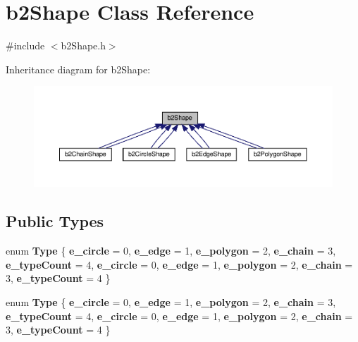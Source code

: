 \hypertarget{classb2Shape}{}\section{b2\+Shape Class Reference}
\label{classb2Shape}


{\ttfamily \#include $<$b2\+Shape.\+h$>$}



Inheritance diagram for b2\+Shape\+:
\nopagebreak
\begin{figure}[H]
\begin{center}
\leavevmode
\includegraphics[width=350pt]{classb2Shape__inherit__graph}
\end{center}
\end{figure}
\subsection*{Public Types}
\begin{DoxyCompactItemize}
\item 
\mbox{\label{classb2Shape_a4c1f3a9ad6b3150bb90ad9018ca4b1e0}} 
enum {\bfseries Type} \{ \newline
{\bfseries e\+\_\+circle} = 0, 
{\bfseries e\+\_\+edge} = 1, 
{\bfseries e\+\_\+polygon} = 2, 
{\bfseries e\+\_\+chain} = 3, 
\newline
{\bfseries e\+\_\+type\+Count} = 4, 
{\bfseries e\+\_\+circle} = 0, 
{\bfseries e\+\_\+edge} = 1, 
{\bfseries e\+\_\+polygon} = 2, 
\newline
{\bfseries e\+\_\+chain} = 3, 
{\bfseries e\+\_\+type\+Count} = 4
 \}
\item 
\mbox{\label{classb2Shape_a4c1f3a9ad6b3150bb90ad9018ca4b1e0}} 
enum {\bfseries Type} \{ \newline
{\bfseries e\+\_\+circle} = 0, 
{\bfseries e\+\_\+edge} = 1, 
{\bfseries e\+\_\+polygon} = 2, 
{\bfseries e\+\_\+chain} = 3, 
\newline
{\bfseries e\+\_\+type\+Count} = 4, 
{\bfseries e\+\_\+circle} = 0, 
{\bfseries e\+\_\+edge} = 1, 
{\bfseries e\+\_\+polygon} = 2, 
\newline
{\bfseries e\+\_\+chain} = 3, 
{\bfseries e\+\_\+type\+Count} = 4
 \}
\end{DoxyCompactItemize}

